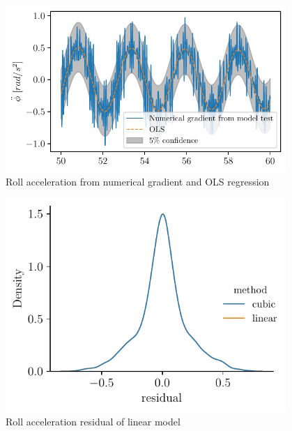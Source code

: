 \begin{figure}[H]
\begin{center}\includegraphics[width = 0.95\textwidth]{figures/roll_acceleration_ols.pdf}\end{center}
\vspace{-0.7cm}
\caption{Roll acceleration from numerical gradient and OLS regression}
\label{fig:roll_acceleration_ols}
\end{figure}
\begin{figure}[H]
\begin{center}\includegraphics[width = 0.95\textwidth]{figures/roll_acceleration_residual.pdf}\end{center}
\vspace{-0.7cm}
\caption{Roll acceleration residual of linear model}
\label{fig:roll_acceleration_residual}
\end{figure}
